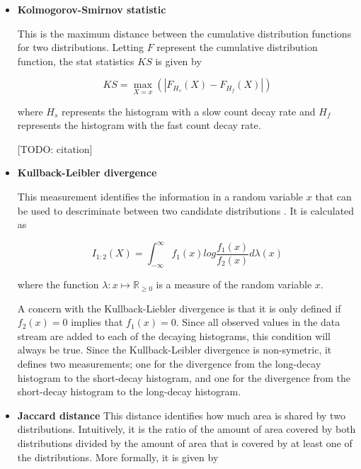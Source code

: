 \documentclass{sig-alternate}
\begin{document}
    \begin{itemize}
    \item{\bf Kolmogorov-Smirnov statistic}

        This is the maximum distance between the cumulative distribution
        functions for two distributions. Letting $F$ represent the cumulative
        distribution function, the stat statistics $KS$ is given by

        \begin{displaymath}
            KS = \max_{X = x}(|F_{H_s}(X) - F_{H_f}(X)|)
        \end{displaymath}

        \noindent where $H_s$ represents the histogram with a slow count decay
        rate and $H_f$ represents the histogram with the fast count decay rate.

        [TODO: citation]

    \item{\bf Kullback-Leibler divergence}

        This measurement identifies the information in a random variable $x$
        that can be used to descriminate between two candidate distributions
        \cite{kullback1951information}. It is calculated as

        \begin{equation}
            I_{1:2}(X) =
                    \int_{-\infty}^{\infty}
                        f_1(x) log \frac{f_1(x)}{f_2(x)} d \lambda(x)
        \end{equation}

        \noindent where the function $\lambda : x \mapsto \mathbb{R}_{\ge 0}$ is
        a measure of the random variable $x$.

        A concern with the Kullback-Liebler divergence is that it is only
        defined if $f_2(x) = 0$ implies that $f_1(x) = 0$. Since all observed
        values in the data stream are added to each of the decaying histograms,
        this condition will always be true. Since the Kullback-Leibler
        divergence is non-symetric, it defines two measurements; one for the
        divergence from the long-decay histogram to the short-decay histogram,
        and one for the divergence from the short-decay histogram to the
        long-decay histogram.

    \item{\bf Jaccard distance}
        This distance identifies how much area is shared by two distributions.
        Intuitively, it is the ratio of the amount of area covered by both
        distributions divided by the amount of area that is covered by at least
        one of the distributions. More formally, it is given by


\end{itemize}
\end{document}
